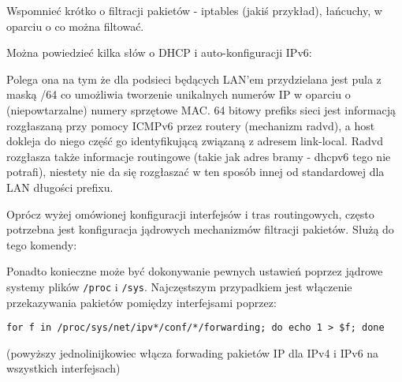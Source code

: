 \documentclass{pdfBooklets}
\begin{document}
\begin{teacherOnly}
	Wspomnieć krótko o filtracji pakietów - iptables (jakiś przykład), łańcuchy, w oparciu o co można filtować.
	
	Można powiedzieć kilka słów o DHCP i auto-konfiguracji IPv6:
	
	Polega ona na tym że dla podsieci będących LAN'em przydzielana jest pula z maską /64 co umożliwia tworzenie unikalnych numerów IP w oparciu o (niepowtarzalne) numery sprzętowe MAC.
	64 bitowy prefiks sieci jest informacją rozgłaszaną przy pomocy ICMPv6 przez routery (mechanizm radvd), a host dokleja do niego część go identyfikującą związaną z adresem link-local.
	Radvd rozgłasza także informacje routingowe (takie jak adres bramy - dhcpv6 tego nie potrafi), niestety nie da się rozgłaszać w ten sposób innej od standardowej dla LAN długości prefixu.
\end{teacherOnly}

Oprócz wyżej omówionej konfiguracji interfejsów i tras routingowych, często potrzebna jest konfiguracja jądrowych mechanizmów filtracji pakietów. Służą do tego komendy:


Ponadto konieczne może być dokonywanie pewnych ustawień poprzez jądrowe systemy plików \Verb$/proc$ i \Verb$/sys$.
Najczęstszym przypadkiem jest włączenie przekazywania pakietów pomiędzy interfejsami poprzez:

\begin{verbatim}
for f in /proc/sys/net/ipv*/conf/*/forwarding; do echo 1 > $f; done
\end{verbatim}
(powyższy jednolinijkowiec włącza forwading pakietów IP dla IPv4 i IPv6 na wszystkich interfejsach)
\end{document}
